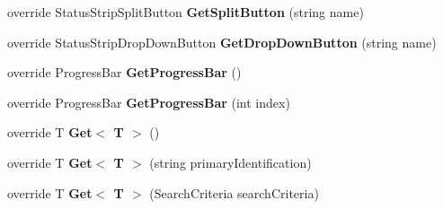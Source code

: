 \begin{DoxyCompactItemize}
\item 
\hypertarget{class_proto_test_1_1_golem_1_1_white_1_1_elements_1_1_white_tool_strip_a36dec97b52ed8fd8eb7f094aad0af780}{override Status\-Strip\-Split\-Button {\bfseries Get\-Split\-Button} (string name)}\label{class_proto_test_1_1_golem_1_1_white_1_1_elements_1_1_white_tool_strip_a36dec97b52ed8fd8eb7f094aad0af780}

\item 
\hypertarget{class_proto_test_1_1_golem_1_1_white_1_1_elements_1_1_white_tool_strip_a4baeba7ffde069b4ac2a2da8d395c79a}{override Status\-Strip\-Drop\-Down\-Button {\bfseries Get\-Drop\-Down\-Button} (string name)}\label{class_proto_test_1_1_golem_1_1_white_1_1_elements_1_1_white_tool_strip_a4baeba7ffde069b4ac2a2da8d395c79a}

\item 
\hypertarget{class_proto_test_1_1_golem_1_1_white_1_1_elements_1_1_white_tool_strip_a1d4dc9ee01ddae3b4951e2e7250726d2}{override Progress\-Bar {\bfseries Get\-Progress\-Bar} ()}\label{class_proto_test_1_1_golem_1_1_white_1_1_elements_1_1_white_tool_strip_a1d4dc9ee01ddae3b4951e2e7250726d2}

\item 
\hypertarget{class_proto_test_1_1_golem_1_1_white_1_1_elements_1_1_white_tool_strip_a999dc9bce8c17eca50fcf8ab5552f1df}{override Progress\-Bar {\bfseries Get\-Progress\-Bar} (int index)}\label{class_proto_test_1_1_golem_1_1_white_1_1_elements_1_1_white_tool_strip_a999dc9bce8c17eca50fcf8ab5552f1df}

\item 
\hypertarget{class_proto_test_1_1_golem_1_1_white_1_1_elements_1_1_white_tool_strip_a0519adce458c32563ee01af42dc2a1a2}{override T {\bfseries Get$<$ T $>$} ()}\label{class_proto_test_1_1_golem_1_1_white_1_1_elements_1_1_white_tool_strip_a0519adce458c32563ee01af42dc2a1a2}

\item 
\hypertarget{class_proto_test_1_1_golem_1_1_white_1_1_elements_1_1_white_tool_strip_a7fdf7a132d5a93de6525e018e8394388}{override T {\bfseries Get$<$ T $>$} (string primary\-Identification)}\label{class_proto_test_1_1_golem_1_1_white_1_1_elements_1_1_white_tool_strip_a7fdf7a132d5a93de6525e018e8394388}

\item 
\hypertarget{class_proto_test_1_1_golem_1_1_white_1_1_elements_1_1_white_tool_strip_a1a374b0f430de3b1520bb1ee44d78ff8}{override T {\bfseries Get$<$ T $>$} (Search\-Criteria search\-Criteria)}\label{class_proto_test_1_1_golem_1_1_white_1_1_elements_1_1_white_tool_strip_a1a374b0f430de3b1520bb1ee44d78ff8}


\end{DoxyCompactItemize}

